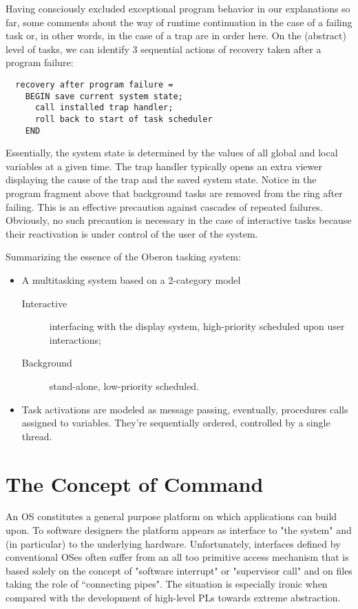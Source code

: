 Having consciously excluded exceptional program behavior in our explanations so far, some
comments about the way of runtime continuation in the case of a failing task or, in other
words, in the case of a trap are in order here. On the (abstract) level of tasks, we can
identify 3 sequential actions of recovery taken after a program failure:
\begin{verbatim}
  recovery after program failure =
    BEGIN save current system state;
      call installed trap handler;
      roll back to start of task scheduler
    END
\end{verbatim}
Essentially, the system state is determined by the values of all global and local variables
at a given time. The trap handler typically opens an extra viewer displaying the cause of
the trap and the saved system state. Notice in the program fragment above that background
tasks are removed from the ring after failing. This is an effective precaution against
cascades of repeated failures. Obviously, no such precaution is necessary in the case of
interactive tasks because their reactivation is under control of the user of the system.

Summarizing the essence of the Oberon tasking system:
\begin{itemize}
  \item A multitasking system based on a 2-category model
  \begin{description}
    \item[Interactive] interfacing with the display system,
      high-priority scheduled upon user interactions;
    \item[Background] stand-alone, low-priority scheduled.
  \end{description}
  \item Task activations are modeled as message passing,
    eventually, procedures calls assigned to variables.
    They're sequentially ordered, controlled by a single thread.
\end{itemize}

\section{The Concept of Command}
\label{sec:command}
An OS constitutes a general purpose platform on which applications can build upon. To
software designers the platform appears as interface to "the system" and (in particular)
to the underlying hardware. Unfortunately, interfaces defined by conventional OSes often
suffer from an all too primitive access mechanism that is based solely on the concept of
"software interrupt" or "supervisor call" and on files taking the role of “connecting pipes".
The situation is especially ironic when compared with the development of high-level
PLs towards extreme abstraction.

